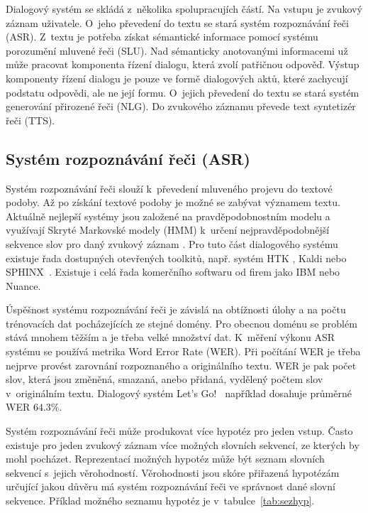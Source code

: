 Dialogový systém se skládá z~několika spolupracujích částí.
Na vstupu je zvukový záznam uživatele.
O~jeho převedení do textu se stará systém rozpoznávání řeči (ASR).
Z~textu je potřeba získat sémantické informace pomocí systému porozumění mluvené řeči (SLU).
Nad sémanticky anotovanými informacemi už může pracovat komponenta řízení dialogu, která zvolí patřičnou odpověď.
Výstup komponenty řízení dialogu je pouze ve formě dialogových aktů, které zachycují podstatu odpovědi, ale ne její formu.
O~jejich převedení do textu se stará systém generování přirozené řeči (NLG).
Do zvukového záznamu převede text syntetizér řeči (TTS).

\subsection{Systém rozpoznávání řeči (ASR)}

Systém rozpoznávání řeči slouží k~převedení mluveného projevu do textové podoby.
Až po získání textové podoby je možné se zabývat významem textu.
Aktuálně nejlepší systémy jsou založené na pravděpodobnostním modelu a využívají Skryté Markovské modely (HMM) k~určení nejpravděpodobnější sekvence slov pro daný zvukový záznam \cite{juang1991hidden}.
Pro tuto část dialogového systému existuje řada dostupných otevřených toolkitů, např. systém HTK \cite{young2002htk}, Kaldi \cite{Povey_ASRU2011} nebo SPHINX~\cite{walker2004sphinx}.
Existuje i celá řada komerčního softwaru od firem jako IBM nebo Nuance.

Úspěšnost systému rozpoznávání řeči je závislá na obtížnosti úlohy a na počtu trénovacích dat pocházejících ze stejné domény.
Pro obecnou doménu se problém stává mnohem těžším a je třeba velké množství dat.
K~měření výkonu ASR systému se používá metrika Word Error Rate (WER).
Při počítání WER je třeba nejprve provést zarovnání rozpoznaného a originálního textu.
WER je pak počet slov, která jsou změněná, smazaná, anebo přidaná, vydělený počtem slov v~originálním textu.
Dialogový systém Let's Go!~\cite{raux2006doing} například dosahuje průměrné WER $64.3\%$.

Systém rozpoznávání řeči může produkovat více hypotéz pro jeden vstup.
Často existuje pro jeden zvukový záznam více možných slovních sekvencí, ze kterých by mohl pocházet.
Reprezentací možných hypotéz může být seznam slovních sekvencí s~jejich věrohodností.
Věrohodnosti jsou skóre přiřazená hypotézám určující jakou důvěru má systém rozpoznávání řeči ve správnost dané slovní sekvence.
Příklad možného seznamu hypotéz je v~tabulce~\ref{tab:sezhyp}.

